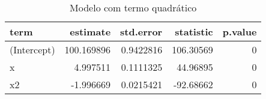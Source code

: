 \begin{table}

\caption{\label{tab:tabela2_exemplo4}Modelo com termo quadrático}
\centering
\begin{tabular}[t]{l|r|r|r|r}
\hline
term & estimate & std.error & statistic & p.value\\
\hline
(Intercept) & 100.169896 & 0.9422816 & 106.30569 & 0\\
\hline
x & 4.997511 & 0.1111325 & 44.96895 & 0\\
\hline
x2 & -1.996669 & 0.0215421 & -92.68662 & 0\\
\hline
\end{tabular}
\end{table}
